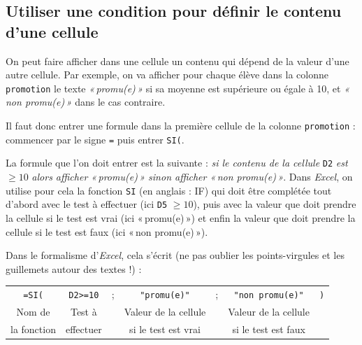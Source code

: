 




 


\subsection{Utiliser une condition pour définir le contenu d'une cellule}\label{Calc3Condition}

On peut faire afficher dans une cellule un contenu qui dépend de la valeur d'une autre cellule. Par exemple, on va afficher pour chaque élève dans la colonne \texttt{promotion} le texte \emph{«\,promu(e)\,»} si sa moyenne est supérieure ou égale à 10, et \emph{«\,non promu(e)\,»} dans le cas contraire.

Il faut donc entrer une formule dans la première cellule de la colonne \texttt{promotion} : commencer par le signe \texttt{=} puis entrer \texttt{SI(}.


La formule que l'on doit entrer est la suivante : \textsl{si le contenu de la cellule} \texttt{D2} \textsl{est} $\geqslant 10$ \textsl{alors afficher «\,promu(e)\,» sinon afficher «\,non promu(e)\,»}. Dans \emph{Excel}, on utilise pour cela la fonction \texttt{SI} (en anglais : IF) qui doit être complétée tout d'abord avec le test à effectuer (ici \texttt{D5} $\geqslant 10$), puis avec la valeur que doit prendre la cellule si le test est vrai (ici «\,promu(e)\,») et enfin la valeur que doit prendre la cellule si le test est faux (ici «\,non promu(e)\,»).

\vspace{1em}

Dans le formalisme d'\emph{Excel}, cela s'écrit (ne pas oublier les points-virgules et les guillemets autour des textes !) :

\begin{center}
\begin{tabular}{ccccccc}
\texttt{=SI(} & \texttt{D2>=10} & ; & \texttt{"promu(e)"} & ; & \texttt{"non promu(e)"} & \texttt{)} \\ 
Nom de & Test à  & & Valeur de la cellule & & Valeur de la cellule & \\
la fonction & effectuer & &  si le test est vrai & & si le test est faux & \\  
\end{tabular}
\end{center}


